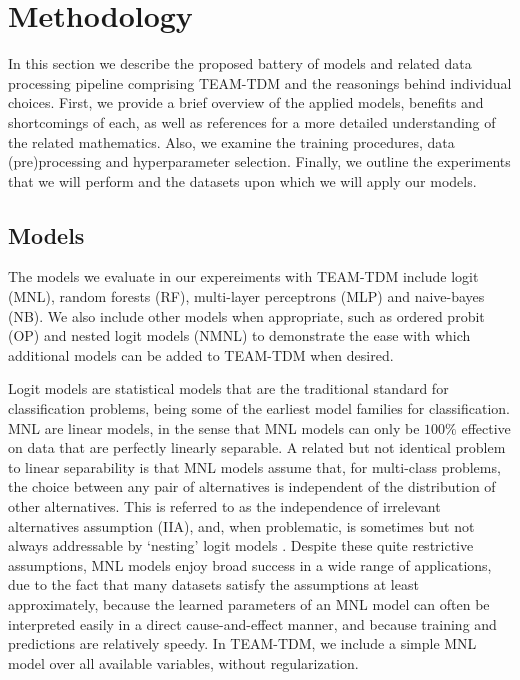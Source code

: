 \documentclass[conference]{IEEEtran}
\begin{document}
\section{Methodology} \label{section:methodology}

In this section we describe the proposed battery of models and related data processing pipeline comprising TEAM-TDM and the reasonings behind individual choices.
 First, we provide a brief overview of the applied models, benefits and shortcomings of each, as well as references for a more detailed understanding of the related mathematics.
 Also, we examine the training procedures, data (pre)processing and hyperparameter selection.
 Finally, we outline the experiments that we will perform and the datasets upon which we will apply our models.

\subsection{Models} \label{subsection:models}

The models we evaluate in our expereiments with TEAM-TDM include logit (MNL), random forests (RF), multi-layer perceptrons (MLP) and naive-bayes (NB).
 We also include other models when appropriate, such as ordered probit (OP) and nested logit models (NMNL) to demonstrate the ease with which additional models can be added to TEAM-TDM when desired.

Logit models \cite{berkson1944application} are statistical models that are the traditional standard for classification problems, being some of the earliest model families for classification.
 MNL are linear models, in the sense that MNL models can only be $100\%$ effective on data that are perfectly linearly separable.
 A related but not identical problem to linear separability is that MNL models assume that, for multi-class problems, the choice between any pair of alternatives is independent of the distribution of other alternatives.
 This is referred to as the independence of irrelevant alternatives assumption (IIA), and, when problematic, is sometimes but not always addressable by `nesting' logit models \cite{mcfadden1978modeling}.
 Despite these quite restrictive assumptions, MNL models enjoy broad success in a wide range of applications, due to the fact that many datasets satisfy the assumptions at least approximately, because the learned parameters of an MNL model can often be interpreted easily in a direct cause-and-effect manner, and because training and predictions are relatively speedy.
 In TEAM-TDM, we include a simple MNL model over all available variables, without regularization.
\end{document}
